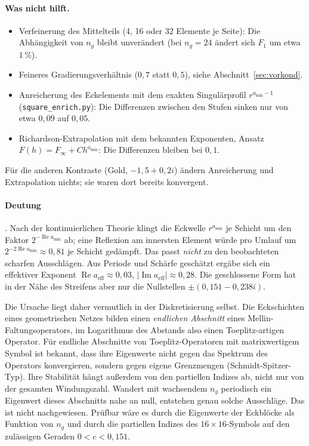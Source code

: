 \documentclass[11pt, a4paper]{article}
\theoremstyle{plain}
\theoremstyle{definition}
\newcommand{\status}[1]{\hfill{\small\sffamily[#1]}}
\begin{document}
\paragraph{Was nicht hilft.}
\begin{itemize}[leftmargin=*]
  \item Verfeinerung des Mittelteils (4, 16 oder 32 Elemente je Seite): Die
    Abhängigkeit von $n_g$ bleibt unverändert (bei $n_g=24$ ändert sich $F_1$ um
    etwa $1\,\%$).
  \item Feineres Gradierungsverhältnis ($0{,}7$ statt $0{,}5$), siehe
    Abschnitt~\ref{sec:vorkond}.
  \item Anreicherung des Eckelements mit dem exakten Singulärprofil
    $r^{a_{\min}-1}$ (\texttt{square\_enrich.py}): Die Differenzen zwischen
    den Stufen sinken nur von etwa $0{,}09$ auf $0{,}05$.
  \item Richardson-Extrapolation mit dem bekannten Exponenten, Ansatz
    $F(h)=F_\infty+Ch^{a_{\min}}$: Die Differenzen bleiben bei $0{,}1$.
\end{itemize}
Für die anderen Kontraste (Gold, $-1{,}5+0{,}2i$) ändern Anreicherung und
Extrapolation nichts; sie waren dort bereits konvergent.

\paragraph{Deutung} \status{Hypothese}. Nach der kontinuierlichen Theorie klingt die
Eckwelle $r^{a_{\min}}$ je Schicht um den Faktor $2^{-\operatorname{Re}a_{\min}}$
ab; eine Reflexion am innersten Element würde pro Umlauf um
$2^{-2\operatorname{Re}a_{\min}}\approx0{,}81$ je Schicht gedämpft. Das passt
\emph{nicht} zu den beobachteten scharfen Ausschlägen. Aus Periode und Schärfe
geschätzt ergäbe sich ein effektiver Exponent $\operatorname{Re}a_{\mathrm{eff}}\approx0{,}03$,
$|\operatorname{Im}a_{\mathrm{eff}}|\approx0{,}28$. Die geschlossene Form hat in der
Nähe des Streifens aber nur die Nullstellen $\pm(0{,}151-0{,}238i)$.

Die Ursache liegt daher vermutlich in der Diskretisierung selbst. Die Eckschichten
eines geometrischen Netzes bilden einen \emph{endlichen Abschnitt} eines
Mellin-Faltungsoperators, im Logarithmus des Abstands also einen
Toeplitz-artigen Operator. Für endliche Abschnitte von Toeplitz-Operatoren mit
matrixwertigem Symbol ist bekannt, dass ihre Eigenwerte nicht gegen das Spektrum
des Operators konvergieren, sondern gegen eigene Grenzmengen (Schmidt-Spitzer-Typ).
Ihre Stabilität hängt außerdem von den partiellen Indizes ab, nicht nur von der
gesamten Windungszahl. Wandert mit wachsendem $n_g$ periodisch ein Eigenwert dieses
Abschnitts nahe an null, entstehen genau solche Ausschläge. Das ist nicht
nachgewiesen. Prüfbar wäre es durch die Eigenwerte der Eckblöcke als Funktion von
$n_g$ und durch die partiellen Indizes des $16\times16$-Symbols auf den zulässigen
Geraden $0<c<0{,}151$.
\end{document}
